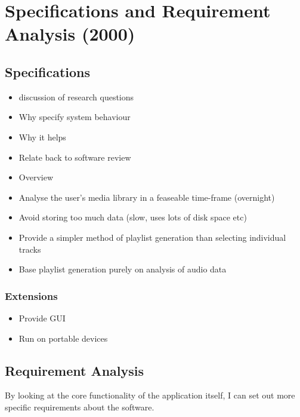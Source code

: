 %
%
\chapter{Specifications and Requirement Analysis (2000)}
\section{Specifications}
\begin{itemize}
	\item discussion of research questions
\end{itemize}
\begin{itemize}
	\item Why specify system behaviour
	\item Why it helps
	\item Relate back to software review
	\item Overview
\end{itemize}
\begin{itemize}
	\item Analyse the user's media library in a feaseable time-frame (overnight)
	\item Avoid storing too much data (slow, uses lots of disk space etc)
	\item Provide a simpler method of playlist generation than selecting individual tracks
	\item Base playlist generation purely on analysis of audio data
\end{itemize}
\subsection{Extensions}
\begin{itemize}
	\item Provide GUI
	\item Run on portable devices
\end{itemize}
\section{Requirement Analysis}
By looking at the core functionality of the application itself,
I can set out more specific requirements about the software.
